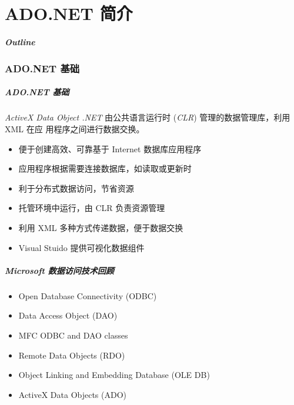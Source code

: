 
\part{ADO.NET 简介}
\begin{frame}
\frametitle{Outline}
\tableofcontents
\end{frame}

\section{ADO.NET 基础}

\begin{frame}
\frametitle{ADO.NET 基础}
\begin{block}{\textit{ActiveX Data Object .NET}}
  \CJKindent 由公共语言运行时 (\textit{CLR}) 管理的数据管理库，利用 XML 在应
  用程序之间进行数据交换。
\end{block}
\begin{itemize}
\item 便于创建高效、可靠基于 Internet 数据库应用程序
\item 应用程序根据需要连接数据库，如读取或更新时
\item 利于分布式数据访问，节省资源
\item 托管环境中运行，由 CLR 负责资源管理
\item 利用 XML 多种方式传递数据，便于数据交换
\item Visual Stuido 提供可视化数据组件
\end{itemize}
\end{frame}

\begin{frame}
\frametitle{Microsoft 数据访问技术回顾}
\begin{itemize}
\setlength{\itemsep}{8pt plus 1pt}
\item Open Database Connectivity (ODBC)
\item Data Access Object (DAO)
\item MFC ODBC and DAO classes
\item Remote Data Objects (RDO)
\item Object Linking and Embedding Database (OLE DB)
\item ActiveX Data Objects (ADO)
\end{itemize}
\end{frame}

